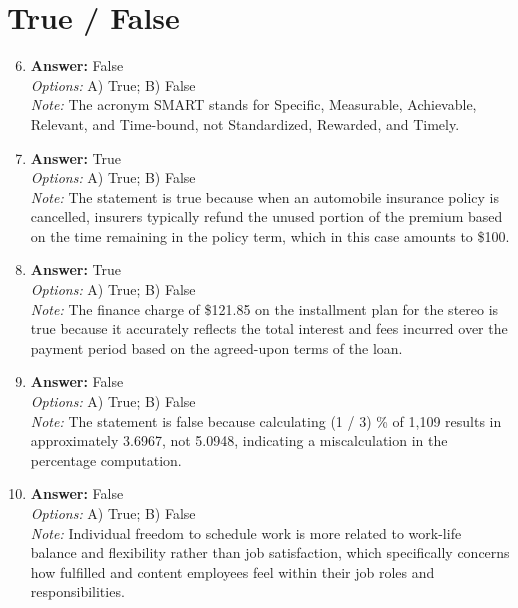 \documentclass[12pt]{article}
\begin{document}
\section*{True / False}
\begin{enumerate}[label=\arabic*.]
\setcounter{enumi}{5}
\item \textbf{Answer:} False
\\ \textit{Options:} A) True; B) False
\\ \textit{Note:} The acronym SMART stands for Specific, Measurable, Achievable, Relevant, and Time-bound, not Standardized, Rewarded, and Timely.
\item \textbf{Answer:} True
\\ \textit{Options:} A) True; B) False
\\ \textit{Note:} The statement is true because when an automobile insurance policy is cancelled, insurers typically refund the unused portion of the premium based on the time remaining in the policy term, which in this case amounts to \$100.
\item \textbf{Answer:} True
\\ \textit{Options:} A) True; B) False
\\ \textit{Note:} The finance charge of \$121.85 on the installment plan for the stereo is true because it accurately reflects the total interest and fees incurred over the payment period based on the agreed-upon terms of the loan.
\item \textbf{Answer:} False
\\ \textit{Options:} A) True; B) False
\\ \textit{Note:} The statement is false because calculating (1 / 3) \% of 1,109 results in approximately 3.6967, not 5.0948, indicating a miscalculation in the percentage computation.
\item \textbf{Answer:} False
\\ \textit{Options:} A) True; B) False
\\ \textit{Note:} Individual freedom to schedule work is more related to work-life balance and flexibility rather than job satisfaction, which specifically concerns how fulfilled and content employees feel within their job roles and responsibilities.
\end{enumerate}
\end{document}
